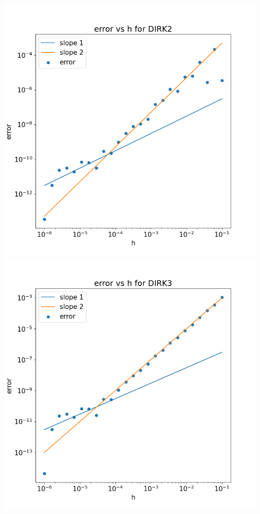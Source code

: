 \documentclass{article}
\begin{document}
\begin{enumerate}[label=(\alph*)]
\begin{center}
	\includegraphics[scale=.3]{hw3 dirk2 err}
	\includegraphics[scale=.3]{hw3 dirk3 err}
\end{center}


\end{enumerate}
\end{document}
